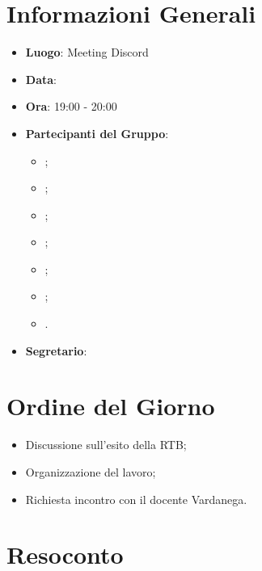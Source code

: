 \section{Informazioni Generali}

\begin{itemize}
\item{\textbf{Luogo}}: Meeting Discord
\item{\textbf{Data}}: \D
\item{\textbf{Ora}}: 19:00 - 20:00
\item{\textbf{Partecipanti del Gruppo}}: 
	\begin{itemize}
	\item{\EP{};} 
	\item{\FP{};}
	\item{\GC{};}
	\item{\LW{};}
	\item{\MB{};}
	\item{\MG{};}
	\item{\PV{}.}
	\end{itemize} 
\item{\textbf{Segretario}}: \PV{}	
\end{itemize}

\section{Ordine del Giorno}
\begin{itemize}
\item{Discussione sull'esito della RTB;}
\item{Organizzazione del lavoro;}
\item{Richiesta incontro con il docente Vardanega.}
\end{itemize}

\section{Resoconto}
 

